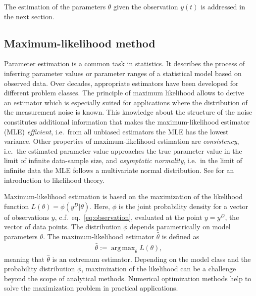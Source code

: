\documentclass[article]{jss}
\DeclareMathOperator*{\argmax}{arg\,max}
\begin{document}
The estimation of the parameters $\theta$ given the observation $y(t)$ is addressed in the next section.



\subsection{Maximum-likelihood method}

Parameter estimation is a common task in statistics. It describes the process of inferring parameter values or parameter ranges of a statistical model based on observed data. Over decades, appropriate estimators have been developed for different problem classes. The principle of maximum likelihood allows to derive an estimator which is especially suited for applications where the distribution of the measurement noise is known. This knowledge about the structure of the noise constitutes additional information that makes the maximum-likelihood estimator (MLE) \textit{efficient}, i.e.~from all unbiased estimators the MLE has the lowest variance. Other properties of maximum-likelihood estimation are \textit{consistency}, i.e.~the estimated parameter value approaches the true parameter value in the limit of infinite data-sample size, and \textit{asymptotic normality}, i.e.~in the limit of infinite data the MLE follows a multivariate normal distribution. See \citep{azzalini1996statistical} for an introduction to likelihood theory.

Maximum-likelihood estimation is based on the maximization of the likelihood function $L(\theta) = \phi(y^D|\theta)$. Here, $\phi$ is the joint probability density for a vector of observations $y$, c.f.~eq.~\eqref{eq:observation}, evaluated at the point $y = y^D$, the vector of data points. The distribution $\phi$ depends parametrically on model parameters $\theta$. The maximum-likelihood estimator $\hat\theta$ is defined as
\begin{align*}
	\hat \theta := \argmax_{\theta} L(\theta),
\end{align*}
meaning that $\hat\theta$ is an extremum estimator. Depending on the model class and the probability distribution $\phi$, maximization of the likelihood can be a challenge beyond the scope of analytical methods. Numerical optimization methods help to solve the maximization problem in practical applications.
\end{document}
